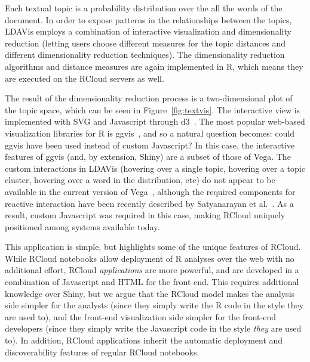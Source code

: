 Each textual topic is a probability distribution over the all the
words of the document. In order to expose patterns in the
relationships between the topics, LDAVis employs a combination of
interactive visualization and dimensionality reduction (letting users
choose different measures for the topic distances and different
dimensionality reduction techniques). The dimensionality reduction
algorithms and distance measures are again implemented in R, which
means they are executed on the RCloud servers as well.

The result of the dimensionality reduction process is a
two-dimensional plot of the topic space, which can be seen in
Figure~\ref{fig:textvis}. The interactive view is implemented with SVG
and Javascript through d3~\cite{Bostock:2011:DDD}. The most popular
web-based visualization libraries for R is ggvis~\cite{ggvis}, and so
a natural question becomes: could ggvis have been used instead of
custom Javascript?  In this case, the interactive features of ggvis
(and, by extension, Shiny) are a subset of those of Vega.  The custom
interactions in LDAVis (hovering over a single topic, hovering over a
topic cluster, hovering over a word in the distribution, etc) do not
appear to be available in the current version of Vega~\cite{vega},
although the required components for reactive interaction have been
recently described by Satyanarayan et
al.~\cite{Satyanarayan:2014:DID}. As a result, custom Javascript was
required in this case, making RCloud uniquely positioned among systems
available today.

This application is simple, but highlights some of the unique features
of RCloud. While RCloud notebooks allow deployment of R analyses over
the web with no additional effort, RCloud \emph{applications} are more
powerful, and are developed in a combination of Javascript and HTML
for the front end. This requires additional knowledge over Shiny, but
we argue that the RCloud model makes the analysis side simpler for the
analysts (since they simply write the R code in the style they are
used to), and the front-end visualization side simpler for the
front-end developers (since they simply write the Javascript code in
the style \emph{they} are used to). In addition, RCloud applications
inherit the automatic deployment and discoverability features of
regular RCloud notebooks.




